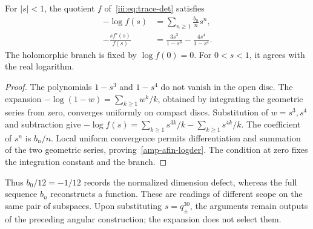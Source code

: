 \begin{theorem}
\label{amp-afin-thm-logdet}
For $|s|<1$, the quotient $f$ of~\eqref{iii:eq:trace-det} satisfies
\begin{align}
 -\log f(s)&=\sum_{n\geq1}\frac{b_n}{n}s^n,\label{amp-afin-logdet}\\
 -\frac{s f'(s)}{f(s)}
 &=\frac{3s^3}{1-s^3}-\frac{4s^4}{1-s^4}.
 \label{amp-afin-logder}
\end{align}
The holomorphic branch is fixed by $\log f(0)=0$.
For $0<s<1$, it agrees with the real logarithm.
\end{theorem}
\begin{proof}
The polynomials $1-s^3$ and $1-s^4$ do not vanish in the open disc.
The expansion $-\log(1-w)=\sum_{k\geq1}w^k/k$, obtained by
integrating the geometric series from zero, converges uniformly on
compact discs. Substitution of $w=s^3,s^4$ and subtraction give
$-\log f(s)=\sum_{k\geq1}s^{3k}/k-\sum_{k\geq1}s^{4k}/k$.
The coefficient of $s^n$ is $b_n/n$.
Local uniform convergence permits differentiation and summation of
the two geometric series, proving~\eqref{amp-afin-logder}.
The condition at zero fixes the integration constant and the branch.
\end{proof}

Thus $b_0/12=-1/12$ records the normalized dimension defect,
whereas the full sequence $b_n$ reconstructs a function.
These are readings of different scope on the same pair of subspaces.
Upon substituting $s=q_\pm^{30}$, the arguments remain outputs of
the preceding angular construction; the expansion does not select them.

